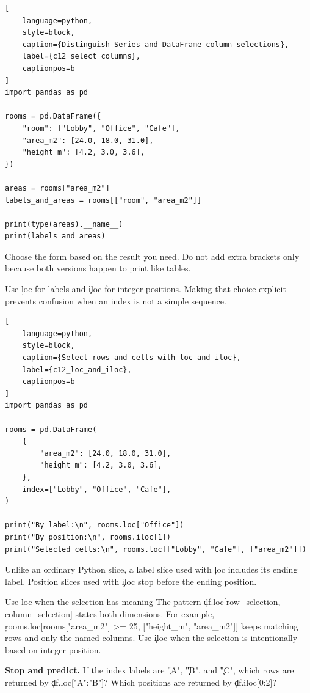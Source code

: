 \begin{lstlisting}[
    language=python,
    style=block,
    caption={Distinguish Series and DataFrame column selections},
    label={c12_select_columns},
    captionpos=b
]
import pandas as pd

rooms = pd.DataFrame({
    "room": ["Lobby", "Office", "Cafe"],
    "area_m2": [24.0, 18.0, 31.0],
    "height_m": [4.2, 3.0, 3.6],
})

areas = rooms["area_m2"]
labels_and_areas = rooms[["room", "area_m2"]]

print(type(areas).__name__)
print(labels_and_areas)
\end{lstlisting}

Choose the form based on the result you need. Do not add extra brackets only
because both versions happen to print like tables.


Use \c{loc} for labels and \c{iloc} for integer positions. Making that choice
explicit prevents confusion when an index is not a simple sequence.

\begin{lstlisting}[
    language=python,
    style=block,
    caption={Select rows and cells with loc and iloc},
    label={c12_loc_and_iloc},
    captionpos=b
]
import pandas as pd

rooms = pd.DataFrame(
    {
        "area_m2": [24.0, 18.0, 31.0],
        "height_m": [4.2, 3.0, 3.6],
    },
    index=["Lobby", "Office", "Cafe"],
)

print("By label:\n", rooms.loc["Office"])
print("By position:\n", rooms.iloc[1])
print("Selected cells:\n", rooms.loc[["Lobby", "Cafe"], ["area_m2"]])
\end{lstlisting}

Unlike an ordinary Python slice, a label slice used with \c{loc} includes its
ending label. Position slices used with \c{iloc} stop before the ending
position.

\begin{SyntaxBox}{Use loc when the selection has meaning}
The pattern \c{df.loc[row_selection, column_selection]} states both
dimensions. For example, \c{rooms.loc[rooms["area_m2"] >= 25, ["height_m",
"area_m2"]]} keeps matching rows and only the named columns. Use \c{iloc}
when the selection is intentionally based on integer position.
\end{SyntaxBox}

\begin{NoteBox}
\textbf{Stop and predict.} If the index labels are \c{"A"}, \c{"B"}, and
\c{"C"}, which rows are returned by \c{df.loc["A":"B"]}? Which positions are
returned by \c{df.iloc[0:2]}?
\end{NoteBox}

